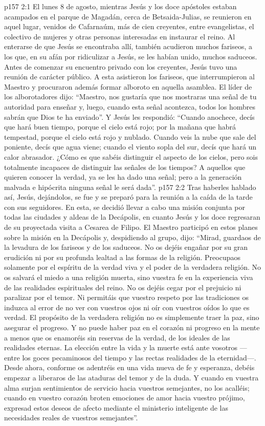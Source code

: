 \vs p157 2:1 El lunes 8 de agosto, mientras Jesús y los doce apóstoles estaban acampados en el parque de Magadán, cerca de Betsaida\hyp{}Julias, se reunieron en aquel lugar, venidos de Cafarnaúm, más de cien creyentes, entre evangelistas, el colectivo de mujeres y otras personas interesadas en instaurar el reino. Al enterarse de que Jesús se encontraba allí, también acudieron muchos fariseos, a los que, en su afán por ridiculizar a Jesús, se les habían unido, muchos saduceos. Antes de comenzar su encuentro privado con los creyentes, Jesús tuvo una reunión de carácter público. A esta asistieron los fariseos, que interrumpieron al Maestro y procuraron además formar alboroto en aquella asamblea. El líder de los alborotadores dijo: “Maestro, nos gustaría que nos mostraras una señal de tu autoridad para enseñar y, luego, cuando esta señal acontezca, todos los hombres sabrán que Dios te ha enviado”. Y Jesús les respondió: “Cuando anochece, decís que hará buen tiempo, porque el cielo está rojo; por la mañana que habrá tempestad, porque el cielo está rojo y nublado. Cuando veis la nube que sale del poniente, decís que agua viene; cuando el viento sopla del sur, decís que hará un calor abrasador. ¿Cómo es que sabéis distinguir el aspecto de los cielos, pero sois totalmente incapaces de distinguir las señales de los tiempos? A aquellos que quieren conocer la verdad, ya se les ha dado una señal; pero a la generación malvada e hipócrita ninguna señal le será dada”.
\vs p157 2:2 \pc Tras haberles hablado así, Jesús, dejándolos, se fue y se preparó para la reunión a la caída de la tarde con sus seguidores. En esta, se decidió llevar a cabo una misión conjunta por todas las ciudades y aldeas de la Decápolis, en cuanto Jesús y los doce regresaran de su proyectada visita a Cesarea de Filipo. El Maestro participó en estos planes sobre la misión en la Decápolis y, despidiendo al grupo, dijo: “Mirad, guardaos de la levadura de los fariseos y de los saduceos. No os dejéis engañar por su gran erudición ni por su profunda lealtad a las formas de la religión. Preocupaos solamente por el espíritu de la verdad viva y el poder de la verdadera religión. No os salvará el miedo a una religión muerta, sino vuestra fe en la experiencia viva de las realidades espirituales del reino. No os dejéis cegar por el prejuicio ni paralizar por el temor. Ni permitáis que vuestro respeto por las tradiciones os induzca al error de no ver con vuestros ojos ni oír con vuestros oídos lo que es verdad. El propósito de la verdadera religión no es simplemente traer la paz, sino asegurar el progreso. Y no puede haber paz en el corazón ni progreso en la mente a menos que os enamoréis sin reservas de la verdad, de los ideales de las realidades eternas. La elección entre la vida y la muerte está ante vosotros ---entre los goces pecaminosos del tiempo y las rectas realidades de la eternidad---. Desde ahora, conforme os adentréis en una vida nueva de fe y esperanza, debéis empezar a liberaros de las ataduras del temor y de la duda. Y cuando en vuestra alma surjan sentimientos de servicio hacia vuestros semejantes, no los acalléis; cuando en vuestro corazón broten emociones de amor hacia vuestro prójimo, expresad estos deseos de afecto mediante el ministerio inteligente de las necesidades reales de vuestros semejantes”.

